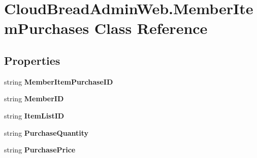 \hypertarget{class_cloud_bread_admin_web_1_1_member_item_purchases}{}\section{Cloud\+Bread\+Admin\+Web.\+Member\+Item\+Purchases Class Reference}
\label{class_cloud_bread_admin_web_1_1_member_item_purchases}
\subsection*{Properties}
\begin{DoxyCompactItemize}
\item 
string {\bfseries Member\+Item\+Purchase\+ID}\hypertarget{class_cloud_bread_admin_web_1_1_member_item_purchases_a1218527c5446b141fbac8ad4517527c9}{}\label{class_cloud_bread_admin_web_1_1_member_item_purchases_a1218527c5446b141fbac8ad4517527c9}

\item 
string {\bfseries Member\+ID}\hypertarget{class_cloud_bread_admin_web_1_1_member_item_purchases_a06b5fa87ef6dd4464243e8cf48a8aee6}{}\label{class_cloud_bread_admin_web_1_1_member_item_purchases_a06b5fa87ef6dd4464243e8cf48a8aee6}

\item 
string {\bfseries Item\+List\+ID}\hypertarget{class_cloud_bread_admin_web_1_1_member_item_purchases_a2b39e997d4686829c0e2b4f80cef5e45}{}\label{class_cloud_bread_admin_web_1_1_member_item_purchases_a2b39e997d4686829c0e2b4f80cef5e45}

\item 
string {\bfseries Purchase\+Quantity}\hypertarget{class_cloud_bread_admin_web_1_1_member_item_purchases_aa10cdb349c48721f060d950ef673d049}{}\label{class_cloud_bread_admin_web_1_1_member_item_purchases_aa10cdb349c48721f060d950ef673d049}

\item 
string {\bfseries Purchase\+Price}\hypertarget{class_cloud_bread_admin_web_1_1_member_item_purchases_a4a90616da6a4bdf22ea9f6fc0bb32762}{}\label{class_cloud_bread_admin_web_1_1_member_item_purchases_a4a90616da6a4bdf22ea9f6fc0bb32762}


\end{DoxyCompactItemize}
